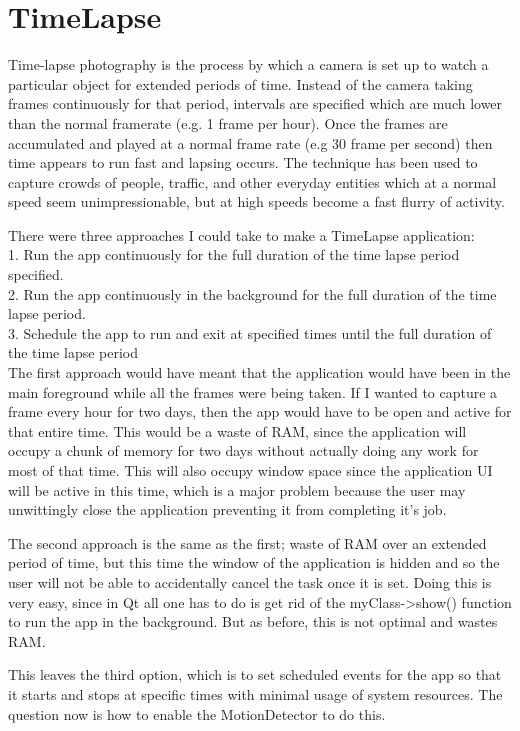 \documentclass[11pt]{article} %
\newcommand{\tab}{\hspace*{2em}}
\begin{document}
\part{TimeLapse}
Time-lapse photography is the process by which a camera is set up to watch a particular object for extended periods of time. Instead of the camera taking frames continuously for that period, intervals are specified which are much lower than the normal framerate (e.g. 1 frame per hour). Once the frames are accumulated and played at a normal frame rate (e.g 30 frame per second) then time appears to run fast and lapsing occurs.
The technique has been used to capture crowds of people, traffic, and other everyday entities which at a normal speed seem unimpressionable, but at high speeds become a fast flurry of activity.

There were three approaches I could take to make a TimeLapse application:\\
\tab1. Run the app continuously for the full duration of the time lapse period specified.\\
\tab2. Run the app continuously in the background for the full duration of the time lapse period.\\
\tab3. Schedule the app to run and exit at specified times until the full duration of the time lapse period\\

The first approach would have meant that the application would have been in the main foreground while all the frames were being taken. If I wanted to capture a frame every hour for two days, then the app would have to be open and active for that entire time. This would be a waste of RAM, since the application will occupy a chunk of memory for two days without actually doing any work for most of that time. This will also occupy window space since the application UI will be active in this time, which is a major problem because the user may unwittingly close the application preventing it from completing it's job.

The second approach is the same as the first; waste of RAM over an extended period of time, but this time the window of the application is hidden and so the user will not be able to accidentally cancel the task once it is set. Doing this is very easy, since in Qt all one has to do is get rid of the myClass->show() function to run the app in the background. But as before, this is not optimal and wastes RAM.

This leaves the third option, which is to set scheduled events for the app so that it starts and stops at specific times with minimal usage of system resources. The question now is how to enable the MotionDetector to do this.
\end{document}
